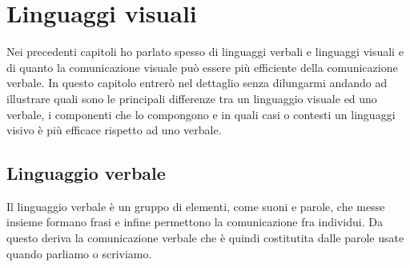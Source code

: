 \chapter{Linguaggi visuali}

    Nei precedenti capitoli ho parlato spesso di linguaggi verbali e linguaggi visuali e di quanto la comunicazione visuale può essere più efficiente della comunicazione verbale. In questo capitolo entrerò nel dettaglio senza dilungarmi andando ad illustrare quali sono le principali differenze tra un linguaggio visuale ed uno verbale, i componenti che lo compongono e in quali casi o contesti un linguaggi visivo è più efficace rispetto ad uno verbale.

    \section{Linguaggio verbale}
        Il linguaggio verbale è un gruppo di elementi, come suoni e parole, che messe insieme formano frasi e infine permettono la comunicazione fra individui. Da questo deriva la comunicazione verbale che è quindi costitutita dalle parole usate quando parliamo o scriviamo.

